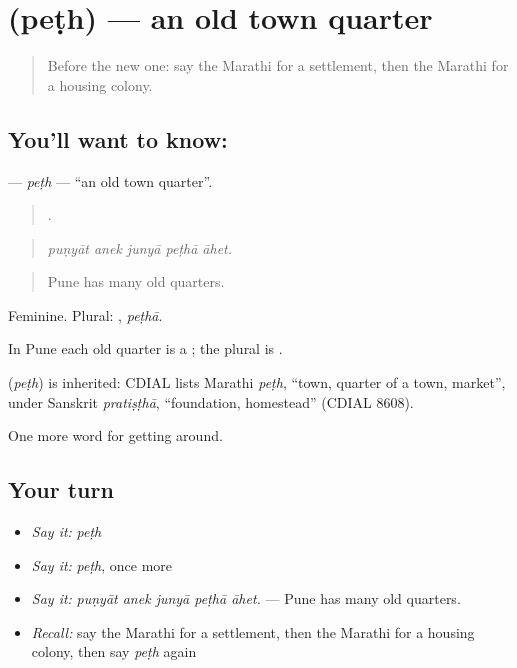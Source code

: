 \section[\texorpdfstring{\mr{पेठ} (peṭh)}{पेठ (peṭh)}]{ (peṭh) — an old town quarter}

\label{lesson:MR-C419-peth}



\begin{quote}
Before the new one: say the Marathi for a settlement, then the Marathi for a housing colony.
\end{quote}

\subsection*{You'll want to know: }
\textbf{} — \emph{peṭh} — \textquotedblleft{}an old town quarter\textquotedblright{}.

\begin{quote}
    .
\end{quote}

\begin{quote}
\emph{puṇyāt anek junyā peṭhā āhet.}
\end{quote}

\begin{quote}
Pune has many old quarters.
\end{quote}

Feminine. Plural: , \emph{peṭhā}.

In Pune each old quarter is a ; the plural is .

\begin{cousinweb}
\textbf{} (\emph{peṭh}) is inherited: CDIAL lists Marathi \emph{peṭh}, \textquotedblleft{}town, quarter of a town, market\textquotedblright{}, under Sanskrit \emph{pratiṣṭhā}, \textquotedblleft{}foundation, homestead\textquotedblright{} (CDIAL 8608).
\end{cousinweb}

\begin{grammarlens}[title={What you've built}]
One more word for getting around.
\end{grammarlens}

\subsection*{Your turn}
\begin{itemize}
\raggedright
  \item \emph{Say it:} \emph{peṭh}
  \item \emph{Say it:} \emph{peṭh}, once more
  \item \emph{Say it:} \emph{puṇyāt anek junyā peṭhā āhet.} — Pune has many old quarters.
  \item \emph{Recall:} say the Marathi for a settlement, then the Marathi for a housing colony, then say \emph{peṭh} again
\end{itemize}

